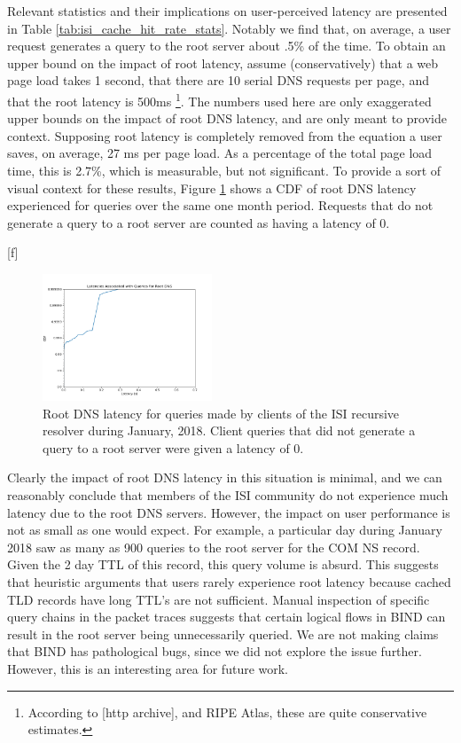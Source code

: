\documentclass[sigconf,nonacm,10pt]{acmart}
\begin{document}
Relevant statistics and their implications on user-perceived latency are
presented in Table \ref{tab:isi_cache_hit_rate_stats}. Notably we find
that, on average, a user request generates a query to the root server
about .5\% of the time. To obtain an upper bound on the impact of root
latency, assume (conservatively) that a web page load takes 1 second,
that there are 10 serial DNS requests per page, and that the root
latency is 500ms
\footnote{ According to [http archive], and RIPE Atlas, these are quite conservative estimates. }.
The numbers used here are only exaggerated upper bounds on the impact of
root DNS latency, and are only meant to provide context. Supposing root
latency is completely removed from the equation a user saves, on
average, 27 ms per page load. As a percentage of the total page load
time, this is 2.7\%, which is measurable, but not significant. To
provide a sort of visual context for these results, Figure
\ref{fig:isi_root_dns_latency} shows a CDF of root DNS latency
experienced for queries over the same one month period. Requests that do
not generate a query to a root server are counted as having a latency of
0.

{[}f{]}

\begin{figure}
    \centering
    \includegraphics[width=0.45\textwidth]{figures/isi_root_dns_latency.png}
    \caption{Root DNS latency for queries made by clients of the ISI recursive resolver during January, 2018. Client queries that did not generate a query to a root server were given a latency of 0. }
    \label{fig:isi_root_dns_latency}
\end{figure}

Clearly the impact of root DNS latency in this situation is minimal, and
we can reasonably conclude that members of the ISI community do not
experience much latency due to the root DNS servers. However, the impact
on user performance is not as small as one would expect. For example, a
particular day during January 2018 saw as many as 900 queries to the
root server for the COM NS record. Given the 2 day TTL of this record,
this query volume is absurd. This suggests that heuristic arguments that
users rarely experience root latency because cached TLD records have
long TTL's are not sufficient. Manual inspection of specific query
chains in the packet traces suggests that certain logical flows in BIND
can result in the root server being unnecessarily queried. We are not
making claims that BIND has pathological bugs, since we did not explore
the issue further. However, this is an interesting area for future work.
\end{document}
